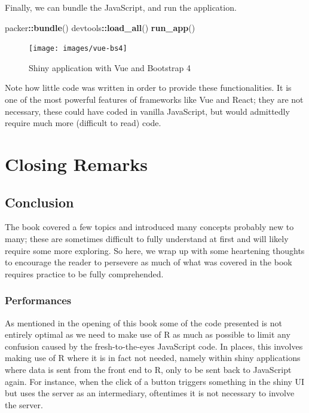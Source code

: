 \documentclass[
  10pt,
]{krantz}
\makeatletter
\newenvironment{Shaded}{\begin{snugshade}}{\end{snugshade}}
\newcommand{\KeywordTok}[1]{\textcolor[rgb]{0.27,0.27,0.27}{\textbf{#1}}}
\newcommand{\NormalTok}[1]{#1}
\newcommand{\OperatorTok}[1]{\textcolor[rgb]{0.43,0.43,0.43}{\textbf{#1}}}
\newenvironment{kframe}{%
\medskip{}
\setlength{\fboxsep}{.8em}
 \def\at@end@of@kframe{}%
 \ifinner\ifhmode%
  \def\at@end@of@kframe{\end{minipage}}%
  \begin{minipage}{\columnwidth}%
 \fi\fi%
 \def\FrameCommand##1{\hskip\@totalleftmargin \hskip-\fboxsep
 \colorbox{shadecolor}{##1}\hskip-\fboxsep
     \hskip-\linewidth \hskip-\@totalleftmargin \hskip\columnwidth}%
 \MakeFramed {\advance\hsize-\width
   \@totalleftmargin\z@ \linewidth\hsize
   \@setminipage}}%
 {\par\unskip\endMakeFramed%
 \at@end@of@kframe}
\renewenvironment{Shaded}{\begin{kframe}}{\end{kframe}}
\makeatother
\begin{document}
Finally, we can bundle the JavaScript, and run the application.

\begin{Shaded}
\begin{Highlighting}[]
\NormalTok{packer}\OperatorTok{::}\KeywordTok{bundle}\NormalTok{()}
\NormalTok{devtools}\OperatorTok{::}\KeywordTok{load\_all}\NormalTok{()}
\KeywordTok{run\_app}\NormalTok{()}
\end{Highlighting}
\end{Shaded}

\begin{figure}[H]

{\centering \texttt{[image: images/vue-bs4]} 

}

\caption{Shiny application with Vue and Bootstrap 4}\label{fig:vue-bs4}
\end{figure}

Note how little code was written in order to provide these functionalities. It is one of the most powerful features of frameworks like Vue and React; they are not necessary, these could have coded in vanilla JavaScript, but would admittedly require much more (difficult to read) code.

\hypertarget{part-closing-remarks}{%
\part{Closing Remarks}\label{part-closing-remarks}}

\hypertarget{conclusion}{%
\chapter{Conclusion}\label{conclusion}}

The book covered a few topics and introduced many concepts probably new to many; these are sometimes difficult to fully understand at first and will likely require some more exploring. So here, we wrap up with some heartening thoughts to encourage the reader to persevere as much of what was covered in the book requires practice to be fully comprehended.

\hypertarget{conclusion-performances}{%
\section{Performances}\label{conclusion-performances}}

As mentioned in the opening of this book some of the code presented is not entirely optimal as we need to make use of R as much as possible to limit any confusion caused by the fresh-to-the-eyes JavaScript code. In places, this involves making use of R where it is in fact not needed, namely within shiny applications where data is sent from the front end to R, only to be sent back to JavaScript again. For instance, when the click of a button triggers something in the shiny UI but uses the server as an intermediary, oftentimes it is not necessary to involve the server.
\end{document}
